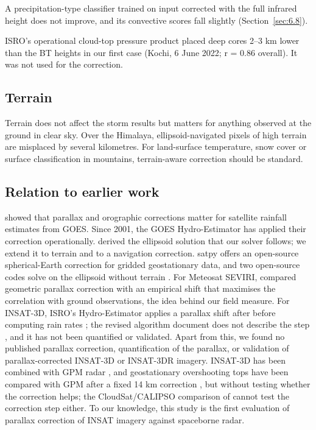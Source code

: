 A precipitation-type classifier trained on input corrected with the full infrared height does not improve, and its convective scores fall slightly (Section~\ref{sec:6.8}).

ISRO's operational cloud-top pressure product placed deep cores 2--3 km lower than the BT heights in our first case (Kochi, 6 June 2022; r = 0.86 overall). It was not used for the correction.

\subsection{Terrain}\label{sec:6.5}

Terrain does not affect the storm results but matters for anything observed at the ground in clear sky. Over the Himalaya, ellipsoid-navigated pixels of high terrain are misplaced by several kilometres. For land-surface temperature, snow cover or surface classification in mountains, terrain-aware correction should be standard.

\subsection{Relation to earlier work}\label{sec:6.6}

\citet{vicente2002} showed that parallax and orographic corrections matter for satellite rainfall estimates from GOES. Since 2001, the GOES Hydro-Estimator \citep{scofield2003} has applied their correction operationally. \citet{bielinski2020} derived the ellipsoid solution that our solver follows; we extend it to terrain and to a navigation correction. satpy \citep{satpy_parallax} offers an open-source spherical-Earth correction for gridded geostationary data, and two open-source codes solve on the ellipsoid without terrain \citep{pyparallax,tsujino2026}. For Meteosat SEVIRI, \citet{wiltink2025} compared geometric parallax correction with an empirical shift that maximises the correlation with ground observations, the idea behind our field measure. For INSAT-3D, ISRO's Hydro-Estimator applies a parallax shift after \citet{vicente2002} before computing rain rates \citep{sac2015atbd,malhan2022}; the revised algorithm document does not describe the step \citep{varma2015}, and it has not been quantified or validated. Apart from this, we found no published parallax correction, quantification of the parallax, or validation of parallax-corrected INSAT-3D or INSAT-3DR imagery. INSAT-3D has been combined with GPM radar \citep{mishra2023}, and geostationary overshooting tops have been compared with GPM after a fixed 14 km correction \citep{sun2024}, but without testing whether the correction helps; the CloudSat/CALIPSO comparison of \citet{kotarba2026} cannot test the correction step either. To our knowledge, this study is the first evaluation of parallax correction of INSAT imagery against spaceborne radar.

